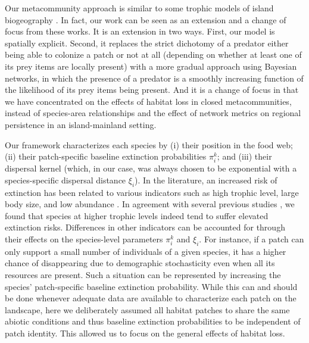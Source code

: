 \documentclass[11pt]{article}
\begin{document}
Our metacommunity approach is similar to some trophic models of island biogeography \citep{Holt2009, Gravel2011PONE, Gravel2011ELE}. In fact, our work can be seen as an extension and a change of focus from these works. It is an extension in two ways. First, our model is spatially explicit. Second, it replaces the strict dichotomy of a predator either being able to colonize a patch or not at all (depending on whether at least one of its prey items are locally present) with a more gradual approach using Bayesian networks, in which the presence of a predator is a smoothly increasing function of the likelihood of its prey items being present. And it is a change of focus in that we have concentrated on the effects of habitat loss in closed metacommunities, instead of species-area relationships and the effect of network metrics on regional persistence in an island-mainland setting.

Our framework characterizes each species by (i) their position in the food web; (ii) their patch-specific baseline extinction probabilities $\pi_i^k$; and (iii) their dispersal kernel (which, in our case, was always chosen to be exponential with a species-specific dispersal distance $\xi_i$). In the literature, an increased risk of extinction has been related to various indicators such as high trophic level, large body size, and low abundance \citep{GastonBlackburn1995, Purvisetal2000, Cardillo2005, Davidson2009, LeeJetz2011}. In agreement with several previous studies \citep{Kondoh2003, vanNouhuys2005, EklofEbenman2006, Curtsdotter2011, Liao2017RSPB, Ryser2019}, we found that species at higher trophic levels indeed tend to suffer elevated extinction risks. Differences in other indicators can be accounted for through their effects on the species-level parameters $\pi_i^k$ and $\xi_i$. For instance, if a patch can only support a small number of individuals of a given species, it has a higher chance of disappearing due to demographic stochasticity even when all its resources are present. Such a situation can be represented by increasing the species' patch-specific baseline extinction probability. While this can and should be done whenever adequate data are available to characterize each patch on the landscape, here we deliberately assumed all habitat patches to share the same abiotic conditions \citep{Leibold2004} and thus baseline extinction probabilities to be independent of patch identity. This allowed us to focus on the general effects of habitat loss.
\end{document}
